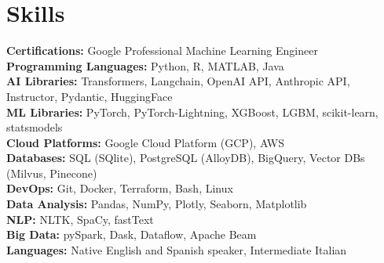 \documentclass[a4paper,11pt]{article}
\begin{document}
\vspace{-0.3cm}

\section{\textbf{Skills}}
 \begin{itemize}[leftmargin=0.15in, label={}]
    {\item{
    \textbf{Certifications:} Google Professional Machine Learning Engineer \\
     \textbf{Programming Languages:} Python, R, MATLAB, Java \\
     \textbf{AI Libraries:} Transformers, Langchain, OpenAI API, Anthropic API, Instructor, Pydantic, HuggingFace \\
     \textbf{ML Libraries:} PyTorch, PyTorch-Lightning, XGBoost, LGBM, scikit-learn, statsmodels \\
     \textbf{Cloud Platforms:} Google Cloud Platform (GCP), AWS \\
     \textbf{Databases:} SQL (SQlite), PostgreSQL (AlloyDB), BigQuery, Vector DBs (Milvus, Pinecone) \\
     \textbf{DevOps:} Git, Docker, Terraform, Bash, Linux \\
     \textbf{Data Analysis:} Pandas, NumPy, Plotly, Seaborn, Matplotlib \\
     \textbf{NLP:} NLTK, SpaCy, fastText \\
     \textbf{Big Data:} pySpark, Dask, Dataflow, Apache Beam \\
     \textbf{Languages:} Native English and Spanish speaker, Intermediate Italian
    }}
 \end{itemize}
\end{document}
